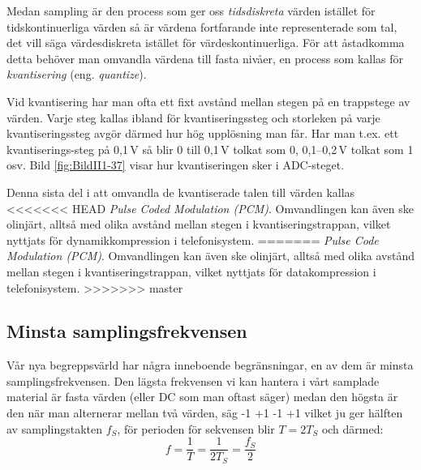 Medan sampling är den process som ger oss \emph{tidsdiskreta} värden istället
för tidskontinuerliga värden så är värdena fortfarande inte representerade som
tal, det vill säga värdesdiskreta istället för värdeskontinuerliga.
För att åstadkomma detta behöver man omvandla värdena till fasta nivåer, en
process som kallas för \emph{kvantisering} (eng. \emph{quantize}).

Vid kvantisering har man ofta ett fixt avstånd mellan stegen på en
trappstege av värden. Varje steg kallas ibland för kvantiseringssteg och
storleken på varje kvantiseringssteg avgör därmed hur hög upplösning man får.
Har man t.ex. ett kvantiserings-steg på 0,1\,V så blir 0 till 0,1\,V tolkat som
0, 0,1--0,2\,V tolkat som 1 osv.
Bild \ref{fig:BildII1-37} visar hur kvantiseringen sker i ADC-steget.

Denna sista del i att omvandla de kvantiserade talen till värden kallas
<<<<<<< HEAD
\emph{Pulse Coded Modulation (PCM)}.
Omvandlingen kan även ske olinjärt, alltså med olika avstånd mellan stegen i 
kvantiseringstrappan, vilket nyttjats för dynamikkompression i telefonisystem.
=======
\emph{Pulse Code Modulation (PCM)}.
Omvandlingen kan även ske olinjärt, alltså med olika avstånd mellan stegen i
kvantiseringstrappan, vilket nyttjats för datakompression i telefonisystem.
>>>>>>> master

\subsection{Minsta samplingsfrekvensen}


Vår nya begreppsvärld har några inneboende begränsningar, en av dem är minsta
samplingsfrekvensen.
Den lägsta frekvensen vi kan hantera i vårt samplade material är fasta värden
(eller DC som man oftast säger) medan den högsta är den när man alternerar
mellan två värden, säg -1 +1 -1 +1 vilket ju ger hälften av samplingstakten
\(f_S\), för perioden för sekvensen blir \(T = 2T_S\) och därmed:
\[   f=\frac{1}{T}=\frac{1}{2T_S}=\frac{f_S}{2}   \]

